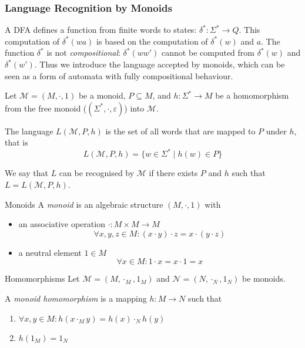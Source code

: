\documentclass[english]{panikzettel}
\begin{document}
\subsubsection{Language Recognition by Monoids}
\label{sssec:monoids}
\begin{halfboxl}
    A DFA defines a function from finite words to states: $\delta^* : \Sigma^* \rightarrow Q$.
    This computation of $\delta^*(wa)$ is based on the computation of $\delta^*(w)$ and $a$.
    The function $\delta^*$ is not \emph{compositional}: $\delta^*(ww')$ cannot be computed from $\delta^*(w)$ and $\delta^*(w')$.
    Thus we introduce the language accepted by monoids, which can be seen as a form of automata with fully compositional behaviour.

    Let $\mathcal{M}=(M,\cdot,1)$ be a monoid, $P \subseteq M$, and $h: \Sigma^* \rightarrow M$ be a homomorphism from the free monoid ($(\Sigma^*,\cdot, \varepsilon)$) into $\mathcal{M}$.

    The language $L(\mathcal{M},P,h)$ is the set of all words that are mapped to $P$ under $h$, that is
    $$L(\mathcal{M},P,h)=\{w \in \Sigma^* \mid h(w) \in P\}$$

    We say that $L$ can be recognised by $\mathcal{M}$ if there exists $P$ and $h$ such that $L=L(\mathcal{M},P,h)$.
\end{halfboxl}%
\begin{halfboxr}
    \vspace{-\baselineskip}
    \begin{defi}{Monoids}
        A \emph{monoid} is an algebraic structure $(M, \cdot,1)$ with
        \begin{itemize}[leftmargin=*]
            \item an associative operation $\cdot : M \times M \rightarrow M$
            $$\forall x,y,z \in M : (x \cdot y) \cdot z = x \cdot (y \cdot z)$$
            \item a neutral element $1 \in M$
            $$\forall x \in M : 1 \cdot x = x \cdot 1 = x$$
        \end{itemize}
    \end{defi}

    \begin{defi}{Homomorphisms}
        Let $\mathcal{M}=(M,\cdot_M, 1_M)$ and $\mathcal{N}=(N,\cdot_N,1_N)$ be monoids.

        A \emph{monoid homomorphism} is a mapping $h : M \rightarrow N$ such that
        \begin{enumerate}
            \item $\forall x,y \in M: h(x \cdot_M y)=h(x) \cdot_N h(y)$
            \item $h(1_M)=1_N$
        \end{enumerate}
    \end{defi}
\end{halfboxr}
\end{document}
